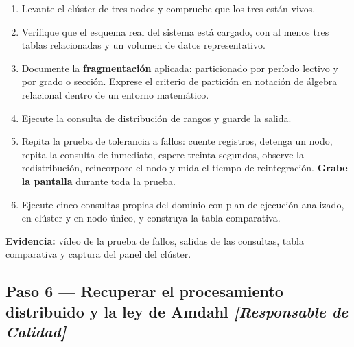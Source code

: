\documentclass[11pt,a4paper]{article}
\newcommand{\paso}[1]{\subsection{#1}}
\begin{document}
	\begin{enumerate}[leftmargin=*,itemsep=4pt]
		\item Levante el clúster de tres nodos y compruebe que los tres están vivos.
		\item Verifique que el esquema real del sistema está cargado, con al menos tres tablas relacionadas y un volumen de datos representativo.
		\item Documente la \textbf{fragmentación} aplicada: particionado por período lectivo y por grado o sección. Exprese el criterio de partición en notación de álgebra relacional dentro de un entorno matemático.
		\item Ejecute la consulta de distribución de rangos y guarde la salida.
		\item Repita la prueba de tolerancia a fallos: cuente registros, detenga un nodo, repita la consulta de inmediato, espere treinta segundos, observe la redistribución, reincorpore el nodo y mida el tiempo de reintegración. \textbf{Grabe la pantalla} durante toda la prueba.
		\item Ejecute cinco consultas propias del dominio con plan de ejecución analizado, en clúster y en nodo único, y construya la tabla comparativa.
	\end{enumerate}
	
	\textbf{Evidencia:} vídeo de la prueba de fallos, salidas de las consultas, tabla comparativa y captura del panel del clúster.
	
	\paso{Paso 6 --- Recuperar el procesamiento distribuido y la ley de Amdahl \emph{[Responsable de Calidad]}}
	
\end{document}
